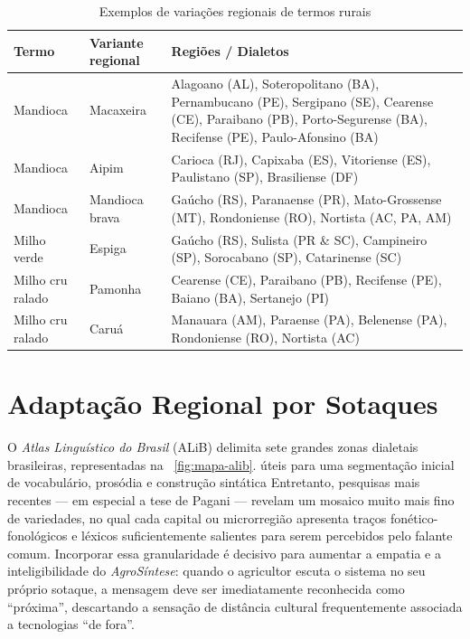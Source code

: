 \begin{table}[H]
	\centering
	\label{tab:variacoes-regionais}
	\caption{Exemplos de variações regionais de termos rurais}
	\begin{tabular}{|l|l|p{8cm}|}
		\hline
		\textbf{Termo}       & \textbf{Variante regional} & \textbf{Regiões / Dialetos} \\ \hline
		
		Mandioca             & Macaxeira                  & Alagoano (AL), Soteropolitano (BA), Pernambucano (PE), Sergipano (SE), Cearense (CE), Paraibano (PB), Porto-Segurense (BA), Recifense (PE), Paulo-Afonsino (BA) \\ \hline
		
		Mandioca             & Aipim                      & Carioca (RJ), Capixaba (ES), Vitoriense (ES), Paulistano (SP), Brasiliense (DF) \\ \hline
		
		Mandioca             & Mandioca brava             & Gaúcho (RS), Paranaense (PR), Mato-Grossense (MT), Rondoniense (RO), Nortista (AC, PA, AM) \\ \hline
		
		Milho verde          & Espiga                     & Gaúcho (RS), Sulista (PR \& SC), Campineiro (SP), Sorocabano (SP), Catarinense (SC) \\ \hline
		
		Milho cru ralado          & Pamonha  & Cearense (CE), Paraibano (PB), Recifense (PE), Baiano (BA), Sertanejo (PI) \\ \hline
		
		Milho cru ralado          & Caruá     & Manauara (AM), Paraense (PA), Belenense (PA), Rondoniense (RO), Nortista (AC) \\ \hline
		
	\end{tabular}
\end{table}


\section{Adaptação Regional por Sotaques}
\label{subsec:sotaques}

O \textit{Atlas Linguístico do Brasil} (ALiB) delimita sete grandes zonas dialetais
brasileiras, representadas na   ~\ref{fig:mapa-alib}. úteis para uma segmentação inicial de vocabulário, prosódia e construção
sintática \cite{cardoso2014alib}  Entretanto, pesquisas mais recentes --- em
especial a tese de Pagani \cite{pagani2022} --- revelam um mosaico muito mais
fino de variedades, no qual cada capital ou microrregião apresenta traços
fonético-fonológicos e léxicos suficientemente salientes para serem percebidos
pelo falante comum.  
Incorporar essa granularidade é decisivo para aumentar a empatia e a
inteligibilidade do \textit{AgroSíntese}: quando o agricultor escuta o sistema
no seu próprio sotaque, a mensagem deve ser imediatamente reconhecida como “próxima”,
descartando a sensação de distância cultural frequentemente associada a
tecnologias “de fora”.

